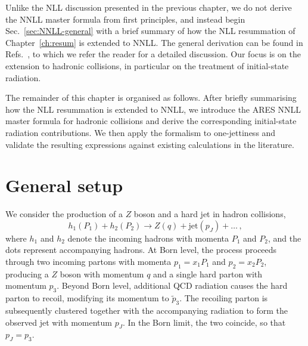 Unlike the NLL discussion presented in the previous chapter, we do not
derive the NNLL master formula from first principles, and instead
begin Sec.~\ref{sec:NNLL-general} with a brief summary of how the NLL
resummation of Chapter~\ref{ch:resum} is extended to NNLL. The general
derivation can be found in Refs.~\cite{Banfi:2014sua,Banfi:2018mcq,
Arpino:2019ozn}, to which we refer the reader for a detailed discussion.
Our focus is on the extension to hadronic collisions, in
particular on the treatment of initial-state radiation.

The remainder of this chapter is organised as follows. After
briefly summarising how the NLL resummation is extended to NNLL, we
introduce the \textsc{ARES} NNLL master formula for hadronic collisions and derive
the corresponding initial-state radiation contributions. We then apply
the formalism to one-jettiness and validate the resulting expressions
against existing calculations in the literature.

\section{General setup}
\label{sec:setup}

We consider the production of a $Z$ boson and a hard jet in hadron collisions,
\begin{equation}
  \label{eq:Z+jet}
  h_1(P_1)+h_2(P_2) \to Z(q) + \mathrm{jet}(p_J)+\dots\,,
\end{equation}
where $h_1$ and $h_2$ denote the incoming hadrons with momenta $P_1$ and $P_2$, and the dots represent accompanying hadrons. At Born level, the process proceeds through two incoming partons with momenta $p_1=x_1P_1$ and $p_2=x_2P_2$, producing a $Z$ boson with momentum $q$ and a single hard parton with momentum $p_3$. 
Beyond Born level, additional QCD radiation causes the hard parton to recoil, modifying its momentum to $\tilde p_3$. The recoiling parton is subsequently clustered together with the accompanying radiation to form the observed jet with momentum $p_J$. In the Born limit, the two coincide, so that $p_J=p_3$.

